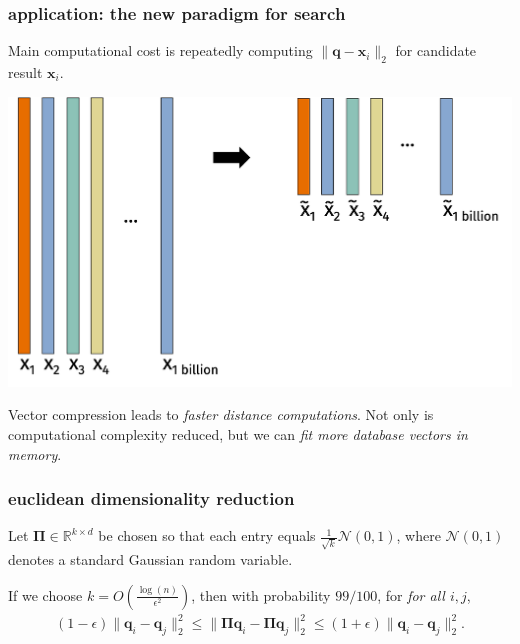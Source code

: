 \documentclass[compress]{beamer}
\newcommand{\bs}[1]{\boldsymbol{#1}}
\newcommand{\bv}[1]{\mathbf{#1}}
\newcommand{\R}{\mathbb{R}}
\begin{document}
\begin{frame}
	\frametitle{application: the new paradigm for search}
	Main computational cost is repeatedly computing $\|\bv{q}-\bv{x}_i\|_2$ for candidate result $\bv{x}_i$. 
	\begin{center}
		\vspace{-.5em}
				\includegraphics[width=.8\textwidth]{database_compression.png}
				\vspace{-.5em}
	\end{center}
	Vector compression leads to \emph{faster distance computations}. Not only is computational complexity reduced, but we can \emph{fit more database vectors in memory}.
\end{frame}

\begin{frame}
	\frametitle{euclidean dimensionality reduction}
	\begin{lemma}
		Let $\bs{\Pi} \in \R^{k\times d}$ be chosen so that each entry equals $\frac{1}{\sqrt{k}}  \mathcal{N}(0,1)$, where $\mathcal{N}(0,1)$ denotes a standard Gaussian random variable. 
		
		If we choose $k = O\left(\frac{\log (n)}{\epsilon^2}\right)$, then with probability $99/100$, for \emph{for all $i,j$},
		\begin{align*}
			(1-\epsilon)\|\bv{q}_i - \bv{q}_j\|_2^{{{2}}} \leq \|\bs{\Pi}\bv{q}_i - \bs{\Pi}\bv{q}_j\|_2^{{{2}}} \leq (1+\epsilon)\|\bv{q}_i - \bv{q}_j\|_2^{{{2}}}.
		\end{align*}
	\end{lemma}
\end{frame}
\end{document}
